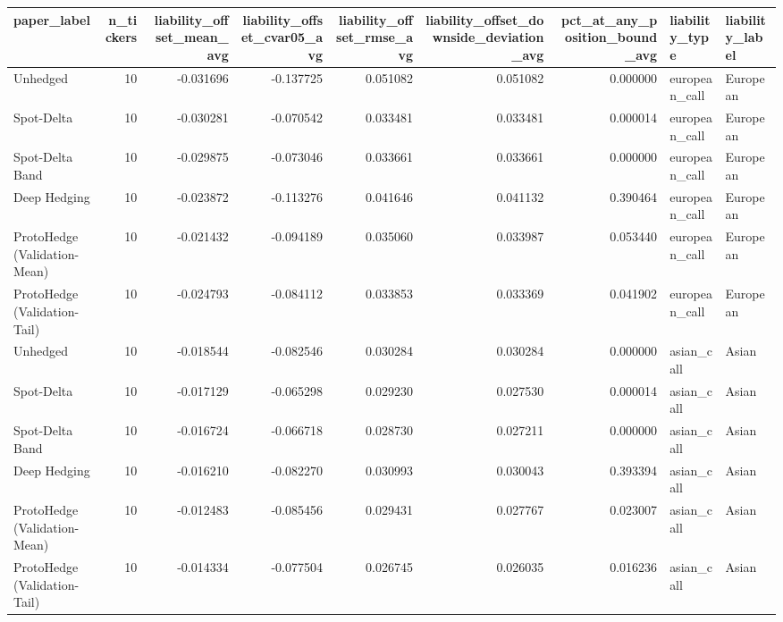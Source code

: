 \begin{tabular}{lrrrrrrll}
\toprule
paper\_label & n\_tickers & liability\_offset\_mean\_avg & liability\_offset\_cvar05\_avg & liability\_offset\_rmse\_avg & liability\_offset\_downside\_deviation\_avg & pct\_at\_any\_position\_bound\_avg & liability\_type & liability\_label \\
\midrule
Unhedged & 10 & -0.031696 & -0.137725 & 0.051082 & 0.051082 & 0.000000 & european\_call & European \\
Spot-Delta & 10 & -0.030281 & -0.070542 & 0.033481 & 0.033481 & 0.000014 & european\_call & European \\
Spot-Delta Band & 10 & -0.029875 & -0.073046 & 0.033661 & 0.033661 & 0.000000 & european\_call & European \\
Deep Hedging & 10 & -0.023872 & -0.113276 & 0.041646 & 0.041132 & 0.390464 & european\_call & European \\
ProtoHedge (Validation-Mean) & 10 & -0.021432 & -0.094189 & 0.035060 & 0.033987 & 0.053440 & european\_call & European \\
ProtoHedge (Validation-Tail) & 10 & -0.024793 & -0.084112 & 0.033853 & 0.033369 & 0.041902 & european\_call & European \\
Unhedged & 10 & -0.018544 & -0.082546 & 0.030284 & 0.030284 & 0.000000 & asian\_call & Asian \\
Spot-Delta & 10 & -0.017129 & -0.065298 & 0.029230 & 0.027530 & 0.000014 & asian\_call & Asian \\
Spot-Delta Band & 10 & -0.016724 & -0.066718 & 0.028730 & 0.027211 & 0.000000 & asian\_call & Asian \\
Deep Hedging & 10 & -0.016210 & -0.082270 & 0.030993 & 0.030043 & 0.393394 & asian\_call & Asian \\
ProtoHedge (Validation-Mean) & 10 & -0.012483 & -0.085456 & 0.029431 & 0.027767 & 0.023007 & asian\_call & Asian \\
ProtoHedge (Validation-Tail) & 10 & -0.014334 & -0.077504 & 0.026745 & 0.026035 & 0.016236 & asian\_call & Asian \\
\bottomrule
\end{tabular}
